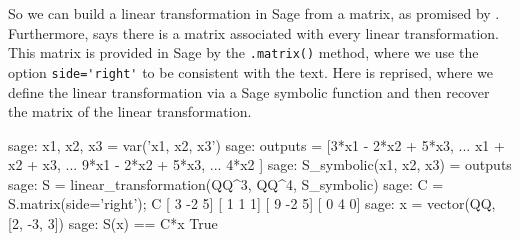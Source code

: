 %
So we can build a linear transformation in Sage from a matrix, as promised by .  Furthermore,  says there is a matrix associated with every linear transformation.  This matrix is provided in Sage by the \verb?.matrix()? method, where we use the option \verb?side='right'? to be consistent with the text.  Here is  reprised, where we define the linear transformation via a Sage symbolic function and then recover the matrix of the linear transformation.
%
\begin{sageexample}
sage: x1, x2, x3 = var('x1, x2, x3')
sage: outputs = [3*x1 - 2*x2 + 5*x3,
...                x1 +   x2 +   x3,
...              9*x1 - 2*x2 + 5*x3,
...                     4*x2       ]
sage: S_symbolic(x1, x2, x3) = outputs
sage: S = linear_transformation(QQ^3, QQ^4, S_symbolic)
sage: C = S.matrix(side='right'); C
[ 3 -2  5]
[ 1  1  1]
[ 9 -2  5]
[ 0  4  0]
sage: x = vector(QQ, [2, -3, 3])
sage: S(x) == C*x
True
\end{sageexample}
%
\begin{sageverbatim}
\end{sageverbatim}
%















